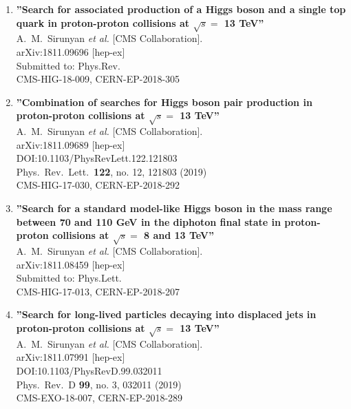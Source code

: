 \begin{enumerate}
\item%
{\bf ''Search for associated production of a Higgs boson and a single top quark in proton-proton collisions at $\sqrt{s} =$ 13 TeV''}
  \\{}A.~M.~Sirunyan {\it et al.} [CMS Collaboration].
  \\{}arXiv:1811.09696 [hep-ex]
  \\{}Submitted to: Phys.Rev.
  \\{}CMS-HIG-18-009, CERN-EP-2018-305

\item%
{\bf ''Combination of searches for Higgs boson pair production in proton-proton collisions at $\sqrt{s} = $ 13 TeV''}
  \\{}A.~M.~Sirunyan {\it et al.} [CMS Collaboration].
  \\{}arXiv:1811.09689 [hep-ex]
  \\{}DOI:10.1103/PhysRevLett.122.121803
  \\{}Phys.\ Rev.\ Lett.\  {\bf 122}, no. 12, 121803 (2019)
  \\{}CMS-HIG-17-030, CERN-EP-2018-292

\item%
{\bf ''Search for a standard model-like Higgs boson in the mass range between 70 and 110 GeV in the diphoton final state in proton-proton collisions at $\sqrt{s}=$ 8 and 13 TeV''}
  \\{}A.~M.~Sirunyan {\it et al.} [CMS Collaboration].
  \\{}arXiv:1811.08459 [hep-ex]
  \\{}Submitted to: Phys.Lett.
  \\{}CMS-HIG-17-013, CERN-EP-2018-207

\item%
{\bf ''Search for long-lived particles decaying into displaced jets in proton-proton collisions at $\sqrt{s}=$ 13 TeV''}
  \\{}A.~M.~Sirunyan {\it et al.} [CMS Collaboration].
  \\{}arXiv:1811.07991 [hep-ex]
  \\{}DOI:10.1103/PhysRevD.99.032011
  \\{}Phys.\ Rev.\ D {\bf 99}, no. 3, 032011 (2019)
  \\{}CMS-EXO-18-007, CERN-EP-2018-289


\end{enumerate}
